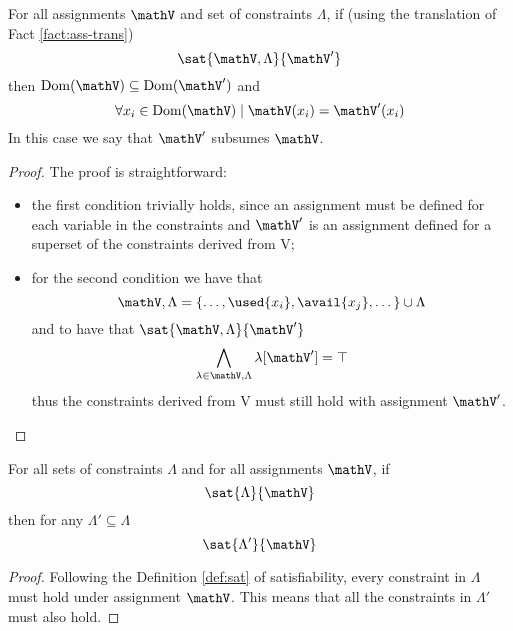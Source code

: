 \begin{lemma}
	\label{lemma:constr}
	For all assignments $\mathV$ and set of constraints $\Lambda$, if (using the translation of Fact \ref{fact:ass-trans})
	$$ \sat{\mathV, \Lambda}{\mathV'} $$
	then $\mathrm{Dom}(\mathV) \subseteq \mathrm{Dom}(\mathV')$ and
	$$ \forall x_i \in \mathrm{Dom}(\mathV) \mid \mathV(x_i) = \mathV'(x_i) $$
	In this case we say that $\mathV'$ subsumes $\mathV$.
\end{lemma}
\begin{proof}
	The proof is straightforward: 
	\begin{itemize}
		\item the first condition trivially holds, since an assignment must be defined for each variable in the constraints and $\mathV'$ is an assignment defined for a superset of the constraints derived from V;
		\item for the second condition we have that
			$$ \mathV, \Lambda = \{ \dots, \used{x_i}, \avail{x_j}, \dots \} \cup \Lambda $$
		and to have that $ \sat{\mathV, \Lambda}{\mathV'} $
			$$ \bigwedge_{\lambda \in \mathV, \Lambda} \lambda[\mathV'] = \top $$
		thus the constraints derived from V must still hold with assignment $\mathV'$.
	\end{itemize}
\end{proof}
\begin{lemma}
	\label{lemma:subsume}
	For all sets of constraints $\Lambda$ and for all assignments $\mathV$, if
	$$ \sat{\Lambda}{\mathV} $$
	then for any $\Lambda' \subseteq \Lambda$
	$$ \sat{\Lambda'}{\mathV} $$
\end{lemma}
\begin{proof}
	Following the Definition \ref{def:sat} of satisfiability, every constraint in $\Lambda$ must hold under assignment $\mathV$.
	This means that all the constraints in $\Lambda'$ must also hold.
\end{proof}

